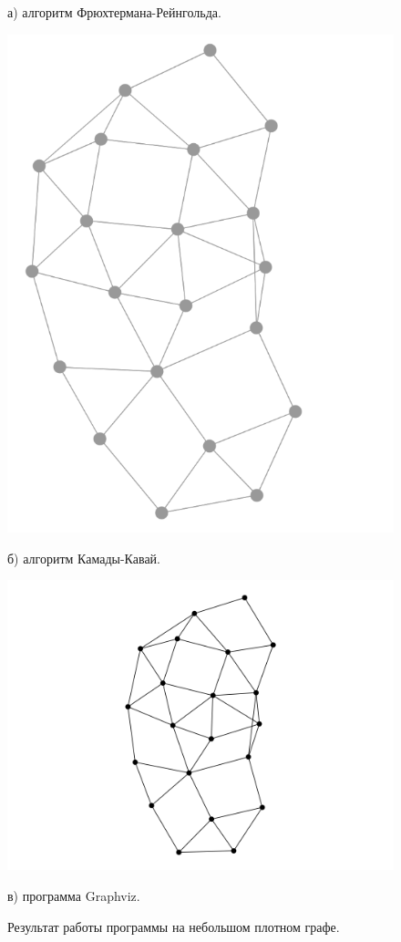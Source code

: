 \documentclass[14pt, russian]{scrartcl}
\begin{document}
\begin{figure}[H]
\begin{minipage}[t]{.35\textwidth}
		\caption*{а) алгоритм Фрюхтермана-Рейнгольда.}
	\end{minipage}
	\noindent
	\begin{minipage}[t]{.40\textwidth}
		\centering
		\includegraphics[width=\linewidth]{./imgs/kk_small_dense.png}
		\caption*{б) алгоритм Камады-Кавай.}
	\end{minipage}
	\begin{minipage}[t]{.55\textwidth}
		\centering
		\includegraphics[width=\linewidth]{./imgs/small_dense_gv.png}
		\caption*{в) программа Graphviz.}
	\end{minipage}
	\caption{Результат работы программы на небольшом плотном графе.}
	\label{fig:small_dense_res}
\end{figure}
\end{document}
